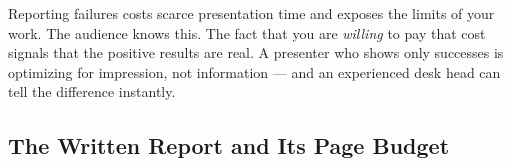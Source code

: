 \begin{intuition}
Reporting failures costs scarce presentation time and exposes the limits of your work. The audience knows this. The fact that you are \emph{willing} to pay that cost signals that the positive results are real. A presenter who shows only successes is optimizing for impression, not information --- and an experienced desk head can tell the difference instantly.
\end{intuition}

\subsection{The Written Report and Its Page Budget}
\label{subsec:report-structure}


